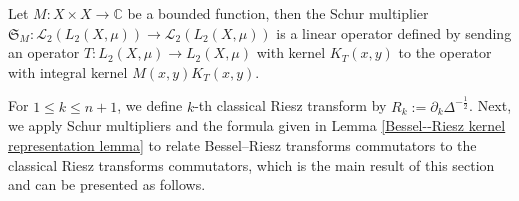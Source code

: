 \documentclass[12pt]{amsart}
\begin{document}
\begin{definition}
Let $M:X\times X\rightarrow \mathbb{C}$ be a bounded function, then the Schur multiplier $\mathfrak{S}_M: \mathcal{L}_2(L_2(X,\mu))\rightarrow \mathcal{L}_2(L_2(X,\mu))$ is a linear operator defined by sending an operator $T:L_2(X,\mu)\rightarrow L_2(X,\mu)$ with kernel $K_T(x,y)$ to the operator with integral kernel $M(x,y)K_T(x,y).$
\end{definition}
For $1\leq k\leq n+1$, we define $k$-th classical Riesz transform by $R_k:=\partial_k\Delta^{-\frac12}$.
Next, we apply Schur multipliers and the formula given in Lemma \ref{Bessel--Riesz kernel representation lemma} to relate Bessel--Riesz transforms commutators to the classical Riesz transforms commutators, which is the main result of this section and can be presented as follows.
\end{document}
